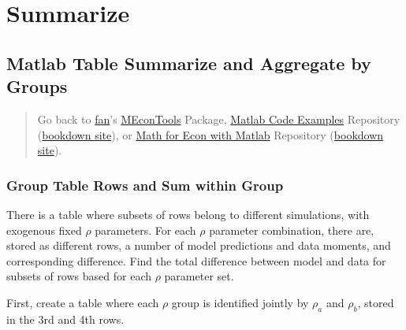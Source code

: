 \documentclass[
]{book}
\begin{document}
\hypertarget{summarize}{%
\section{Summarize}\label{summarize}}

\hypertarget{matlab-table-summarize-and-aggregate-by-groups}{%
\subsection{Matlab Table Summarize and Aggregate by Groups}\label{matlab-table-summarize-and-aggregate-by-groups}}

\begin{quote}
Go back to \href{http://fanwangecon.github.io/}{fan}'s \href{https://fanwangecon.github.io/MEconTools/}{MEconTools} Package, \href{https://fanwangecon.github.io/M4Econ/}{Matlab Code Examples} Repository (\href{https://fanwangecon.github.io/M4Econ/bookdown}{bookdown site}), or \href{https://fanwangecon.github.io/Math4Econ/}{Math for Econ with Matlab} Repository (\href{https://fanwangecon.github.io/Math4Econ/bookdown}{bookdown site}).
\end{quote}

\hypertarget{group-table-rows-and-sum-within-group}{%
\subsubsection{Group Table Rows and Sum within Group}\label{group-table-rows-and-sum-within-group}}

There is a table where subsets of rows belong to different simulations,
with exogenous fixed \(\rho\) parameters. For each \(\rho\) parameter
combination, there are, stored as different rows, a number of model
predictions and data moments, and corresponding difference. Find the
total difference between model and data for subsets of rows based for
each \(\rho\) parameter set.

First, create a table where each \(\rho\) group is identified jointly by
\(\rho_a\) and \(\rho_b\), stored in the 3rd and 4th rows.
\end{document}
